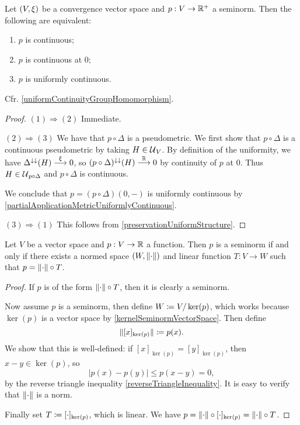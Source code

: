 \begin{proposition} \label{uniformContinuitySeminorms}
Let $\sSet{V,\xi}$ be a convergence vector space and $p: V\to \mathbb{R}^+$ a seminorm. Then the following are equivalent:
\begin{enumerate}
\item $p$ is continuous;
\item $p$ is continuous at $0$;
\item $p$ is uniformly continuous.
\end{enumerate}
\end{proposition}
Cfr. \ref{uniformContinuityGroupHomomorphism}.
\begin{proof}
$(1) \Rightarrow (2)$ Immediate.

$(2) \Rightarrow (3)$ We have that $p\circ \Delta$ is a pseudometric. We first show that $p\circ \Delta$ is a continuous pseudometric by taking $H\in \operatorname{\mathcal{U}}_V$. By definition of the uniformity, we have $\Delta^{\downarrow\downarrow}(H)\overset{\xi}{\longrightarrow} 0$, so $(p\circ \Delta)^{\downarrow\downarrow}(H) \overset{\mathbb{R}}{\longrightarrow} 0$ by continuity of $p$ at $0$. Thus $H\in \operatorname{\mathcal{U}}_{p\circ \Delta}$ and $p\circ \Delta$ is continuous.

We conclude that $p = (p\circ \Delta)(0,-)$ is uniformly continuous by \ref{partialApplicationMetricUniformlyContinuous}.

$(3) \Rightarrow (1)$ This follows from \ref{preservationUniformStructure}.
\end{proof}

\begin{proposition} \label{seminormFactorisation}
Let $V$ be a vector space and $p: V\to \mathbb{R}$ a function. Then $p$ is a seminorm \textup{if and only if} there exists a normed space $\sSet{W,\norm{\cdot}}$ and linear function $T: V\to W$ such that $p = \lVert\cdot\rVert\circ T$.
\end{proposition}
\begin{proof}
If $p$ is of the form $\lVert\cdot\rVert\circ T$, then it is clearly a seminorm.

Now assume $p$ is a seminorm, then define $W \coloneqq V/\ker(p)$, which works because $\ker(p)$ is a vector space by \ref{kernelSeminormVectorSpace}. Then define
\[ \lVert[x]_{\ker(p)}\rVert \coloneqq p(x). \]
We show that this is well-defined: if $[x]_{\ker(p)} = [y]_{\ker(p)}$, then $x-y\in \ker(p)$, so 
\[ |p(x) - p(y)| \leq p(x-y) = 0, \]
by the reverse triangle inequality \ref{reverseTriangleInequality}. It is easy to verify that $\lVert\cdot\rVert$ is a norm.

Finally set $T \coloneqq [\cdot]_{\ker(p)}$, which is linear. We have $p = \lVert\cdot\rVert\circ [\cdot]_{\ker(p)} = \lVert\cdot\rVert\circ T$.
\end{proof}

